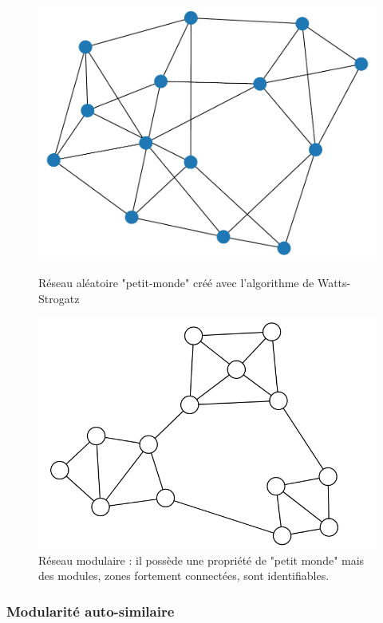 \begin{figure}
\begin{minipage}{0.5\textwidth}
\includegraphics[width=\textwidth]{watts_strogatz.pdf}
\caption{Réseau aléatoire "petit-monde" créé avec l'algorithme de Watts-Strogatz}
\end{minipage}
\begin{minipage}{0.5\textwidth}
\includegraphics[width=\textwidth]{small_world_net.png}
\caption{Réseau modulaire : il possède une propriété de "petit monde" mais des modules, zones fortement connectées, sont identifiables.}
\end{minipage}

\end{figure}
\subsubsection{Modularité auto-similaire}

